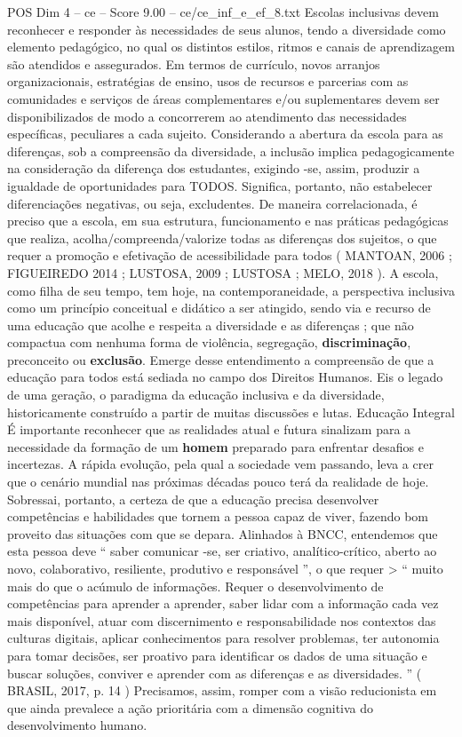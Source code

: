 \begin{textsample}{POS Dim 4 – ce – Score 9.00 – ce/ce\_inf\_e\_ef\_8.txt}
Escolas inclusivas devem reconhecer e responder às necessidades de seus alunos, tendo a diversidade como elemento pedagógico, no qual os distintos estilos, ritmos e canais de aprendizagem são atendidos e assegurados.
Em termos de currículo, novos arranjos organizacionais, estratégias de ensino, usos de recursos e parcerias com as comunidades e serviços de áreas complementares e/ou suplementares devem ser disponibilizados de modo a concorrerem ao atendimento das necessidades específicas, peculiares a cada sujeito.
Considerando a abertura da escola para as diferenças, sob a compreensão da diversidade, a inclusão implica pedagogicamente na consideração da diferença dos estudantes, exigindo -se, assim, produzir a igualdade de oportunidades para TODOS.
Significa, portanto, não estabelecer diferenciações negativas, ou seja, excludentes.
De maneira correlacionada, é preciso que a escola, em sua estrutura, funcionamento e nas práticas pedagógicas que realiza, acolha/compreenda/valorize todas as diferenças dos sujeitos, o que requer a promoção e efetivação de acessibilidade para todos ( MANTOAN, 2006 ; FIGUEIREDO 2014 ; LUSTOSA, 2009 ; LUSTOSA ; MELO, 2018 ).
A escola, como filha de seu tempo, tem hoje, na contemporaneidade, a perspectiva inclusiva como um princípio conceitual e didático a ser atingido, sendo via e recurso de uma educação que acolhe e respeita a diversidade e as diferenças ; que não compactua com nenhuma forma de violência, segregação, \textbf{discriminação}, preconceito ou \textbf{exclusão}.
Emerge desse entendimento a compreensão de que a educação para todos está sediada no campo dos Direitos Humanos.
Eis o legado de uma geração, o paradigma da educação inclusiva e da diversidade, historicamente construído a partir de muitas discussões e lutas.
Educação Integral É importante reconhecer que as realidades atual e futura sinalizam para a necessidade da formação de um \textbf{homem} preparado para enfrentar desafios e incertezas.
A rápida evolução, pela qual a sociedade vem passando, leva a crer que o cenário mundial nas próximas décadas pouco terá da realidade de hoje.
Sobressai, portanto, a certeza de que a educação precisa desenvolver competências e habilidades que tornem a pessoa capaz de viver, fazendo bom proveito das situações com que se depara.
Alinhados à BNCC, entendemos que esta pessoa deve “ saber comunicar -se, ser criativo, analítico-crítico, aberto ao novo, colaborativo, resiliente, produtivo e responsável ”, o que requer > “ muito mais do que o acúmulo de informações.
Requer o desenvolvimento de competências para aprender a aprender, saber lidar com a informação cada vez mais disponível, atuar com discernimento e responsabilidade nos contextos das culturas digitais, aplicar conhecimentos para resolver problemas, ter autonomia para tomar decisões, ser proativo para identificar os dados de uma situação e buscar soluções, conviver e aprender com as diferenças e as diversidades. ” ( BRASIL, 2017, p. 14 ) Precisamos, assim, romper com a visão reducionista em que ainda prevalece a ação prioritária com a dimensão cognitiva do desenvolvimento humano.

\end{textsample}
